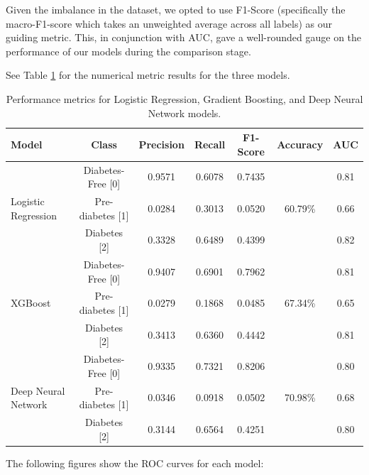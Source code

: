 \documentclass[conference]{IEEEtran}
\begin{document}
Given the imbalance in the dataset, we opted to use F1-Score (specifically the macro-F1-score which takes an unweighted average across all labels) as our guiding metric. This, in conjunction with AUC, gave a well-rounded gauge on the performance of our models during the comparison stage.

See Table \ref{tab:results} for the numerical metric results for the three models.

    \begin{table}[t]
        \centering
        \begin{tabular}{|l|c|c|c|c|c|c|}
            \hline
            \textbf{Model} & \textbf{Class} & \textbf{Precision} & \textbf{Recall} & \textbf{F1-Score} & \textbf{Accuracy} & \textbf{AUC} \\ \hline
            \multirow{3}{*}{Logistic Regression} & Diabetes-Free [0] & 0.9571 & 0.6078 & 0.7435 & \multirow{3}{*}{60.79\%} & 0.81 \\ \cline{2-5} \cline{7-7} 
             & Pre-diabetes [1] & 0.0284 & 0.3013 & 0.0520 &  & 0.66 \\ \cline{2-5} \cline{7-7} 
             & Diabetes [2] & 0.3328 & 0.6489 & 0.4399 &  & 0.82 \\ \hline
            \multirow{3}{*}{XGBoost} & Diabetes-Free [0] & 0.9407 & 0.6901 & 0.7962 & \multirow{3}{*}{67.34\%} & 0.81 \\ \cline{2-5} \cline{7-7} 
             & Pre-diabetes [1] & 0.0279 & 0.1868 & 0.0485 &  & 0.65 \\ \cline{2-5} \cline{7-7} 
             & Diabetes [2] & 0.3413 & 0.6360 & 0.4442 &  & 0.81 \\ \hline
            \multirow{3}{*}{Deep Neural Network} & Diabetes-Free [0] & 0.9335 & 0.7321 & 0.8206 & \multirow{3}{*}{70.98\%} & 0.80 \\ \cline{2-5} \cline{7-7} 
             & Pre-diabetes [1] & 0.0346 & 0.0918 & 0.0502 &  & 0.68 \\ \cline{2-5} \cline{7-7} 
             & Diabetes [2] & 0.3144 & 0.6564 & 0.4251 &  & 0.80 \\ \hline
        \end{tabular}
        \vspace{0.2cm}
        \caption{Performance metrics for Logistic Regression, Gradient Boosting, and Deep Neural Network models.}
        \label{tab:results}
    \end{table}

    The following figures show the ROC curves for each model:
\end{document}
